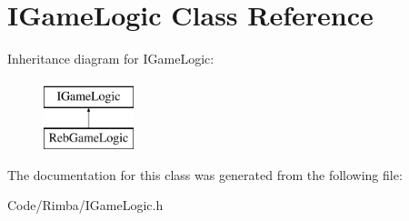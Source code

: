\hypertarget{class_i_game_logic}{}\section{I\+Game\+Logic Class Reference}
\label{class_i_game_logic}
Inheritance diagram for I\+Game\+Logic\+:\begin{figure}[H]
\begin{center}
\leavevmode
\includegraphics[height=2.000000cm]{class_i_game_logic}
\end{center}
\end{figure}


The documentation for this class was generated from the following file\+:\begin{DoxyCompactItemize}
\item 
Code/\+Rimba/I\+Game\+Logic.\+h\end{DoxyCompactItemize}

